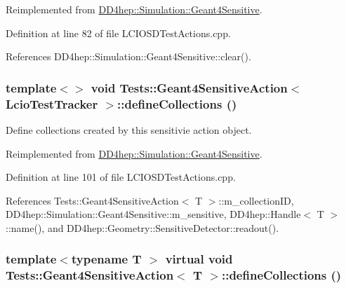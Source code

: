 Reimplemented from \hyperlink{class_d_d4hep_1_1_simulation_1_1_geant4_sensitive_a3bb1c2f79261a98e83ec22102281d117}{DD4hep::Simulation::Geant4Sensitive}.

Definition at line 82 of file LCIOSDTestActions.cpp.

References DD4hep::Simulation::Geant4Sensitive::clear().\hypertarget{class_tests_1_1_geant4_sensitive_action_a1b06a4ee804c34ed5a77145c4b2ec736}{
\subsubsection[{defineCollections}]{\setlength{\rightskip}{0pt plus 5cm}template$<$$>$ void {\bf Tests::Geant4SensitiveAction}$<$ {\bf LcioTestTracker} $>$::defineCollections ()}}
\label{class_tests_1_1_geant4_sensitive_action_a1b06a4ee804c34ed5a77145c4b2ec736}


Define collections created by this sensitivie action object. 

Reimplemented from \hyperlink{class_d_d4hep_1_1_simulation_1_1_geant4_sensitive_a88c872b79e49e399c8ee282960c2d77d}{DD4hep::Simulation::Geant4Sensitive}.

Definition at line 101 of file LCIOSDTestActions.cpp.

References Tests::Geant4SensitiveAction$<$ T $>$::m\_\-collectionID, DD4hep::Simulation::Geant4Sensitive::m\_\-sensitive, DD4hep::Handle$<$ T $>$::name(), and DD4hep::Geometry::SensitiveDetector::readout().\hypertarget{class_tests_1_1_geant4_sensitive_action_a0083f23f8b2160bc6e03ccd11077182c}{
\subsubsection[{defineCollections}]{\setlength{\rightskip}{0pt plus 5cm}template$<$typename T $>$ virtual void {\bf Tests::Geant4SensitiveAction}$<$ {\bf T} $>$::defineCollections ()}}
\label{class_tests_1_1_geant4_sensitive_action_a0083f23f8b2160bc6e03ccd11077182c}


